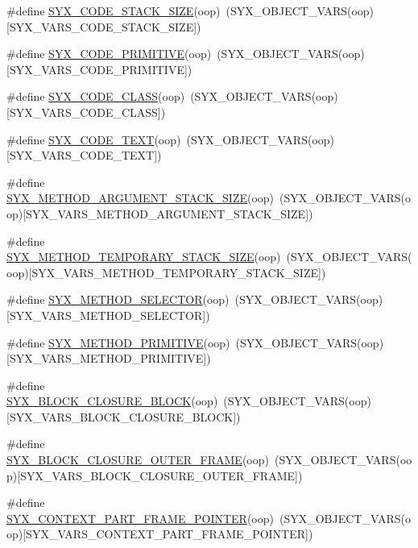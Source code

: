 \begin{CompactItemize}
\#define \hyperlink{syx-object_8h_11c316115d1fc6959e463779cc7b42df}{SYX\_\-CODE\_\-STACK\_\-SIZE}(oop)~(SYX\_\-OBJECT\_\-VARS(oop)\mbox{[}SYX\_\-VARS\_\-CODE\_\-STACK\_\-SIZE\mbox{]})
\item 
\#define \hyperlink{syx-object_8h_8e1e73926a6cccc562a3888f4fdf84a8}{SYX\_\-CODE\_\-PRIMITIVE}(oop)~(SYX\_\-OBJECT\_\-VARS(oop)\mbox{[}SYX\_\-VARS\_\-CODE\_\-PRIMITIVE\mbox{]})
\item 
\#define \hyperlink{syx-object_8h_456cf11d874f9f0553fadd714775316d}{SYX\_\-CODE\_\-CLASS}(oop)~(SYX\_\-OBJECT\_\-VARS(oop)\mbox{[}SYX\_\-VARS\_\-CODE\_\-CLASS\mbox{]})
\item 
\#define \hyperlink{syx-object_8h_5fc722344cbf193793fcb270dc36607a}{SYX\_\-CODE\_\-TEXT}(oop)~(SYX\_\-OBJECT\_\-VARS(oop)\mbox{[}SYX\_\-VARS\_\-CODE\_\-TEXT\mbox{]})
\item 
\#define \hyperlink{syx-object_8h_ac97fbf967b26d249d0ba6afe235e39c}{SYX\_\-METHOD\_\-ARGUMENT\_\-STACK\_\-SIZE}(oop)~(SYX\_\-OBJECT\_\-VARS(oop)\mbox{[}SYX\_\-VARS\_\-METHOD\_\-ARGUMENT\_\-STACK\_\-SIZE\mbox{]})
\item 
\#define \hyperlink{syx-object_8h_9cfacc4bce3b3d7004afe33c25b9d2c7}{SYX\_\-METHOD\_\-TEMPORARY\_\-STACK\_\-SIZE}(oop)~(SYX\_\-OBJECT\_\-VARS(oop)\mbox{[}SYX\_\-VARS\_\-METHOD\_\-TEMPORARY\_\-STACK\_\-SIZE\mbox{]})
\item 
\#define \hyperlink{syx-object_8h_e98de75db34b515c3f1141bd3edbccd4}{SYX\_\-METHOD\_\-SELECTOR}(oop)~(SYX\_\-OBJECT\_\-VARS(oop)\mbox{[}SYX\_\-VARS\_\-METHOD\_\-SELECTOR\mbox{]})
\item 
\#define \hyperlink{syx-object_8h_539c213e23ecd6648b7219ba0f1fe40b}{SYX\_\-METHOD\_\-PRIMITIVE}(oop)~(SYX\_\-OBJECT\_\-VARS(oop)\mbox{[}SYX\_\-VARS\_\-METHOD\_\-PRIMITIVE\mbox{]})
\item 
\#define \hyperlink{syx-object_8h_3b6abd50b74d739d7866ac4a34c9186c}{SYX\_\-BLOCK\_\-CLOSURE\_\-BLOCK}(oop)~(SYX\_\-OBJECT\_\-VARS(oop)\mbox{[}SYX\_\-VARS\_\-BLOCK\_\-CLOSURE\_\-BLOCK\mbox{]})
\item 
\#define \hyperlink{syx-object_8h_f517578c6962e7925851fb6d88ebfa98}{SYX\_\-BLOCK\_\-CLOSURE\_\-OUTER\_\-FRAME}(oop)~(SYX\_\-OBJECT\_\-VARS(oop)\mbox{[}SYX\_\-VARS\_\-BLOCK\_\-CLOSURE\_\-OUTER\_\-FRAME\mbox{]})
\item 
\#define \hyperlink{syx-object_8h_d00ad7dc6539a466500aeeb34524437a}{SYX\_\-CONTEXT\_\-PART\_\-FRAME\_\-POINTER}(oop)~(SYX\_\-OBJECT\_\-VARS(oop)\mbox{[}SYX\_\-VARS\_\-CONTEXT\_\-PART\_\-FRAME\_\-POINTER\mbox{]})
\item 

\end{CompactItemize}
